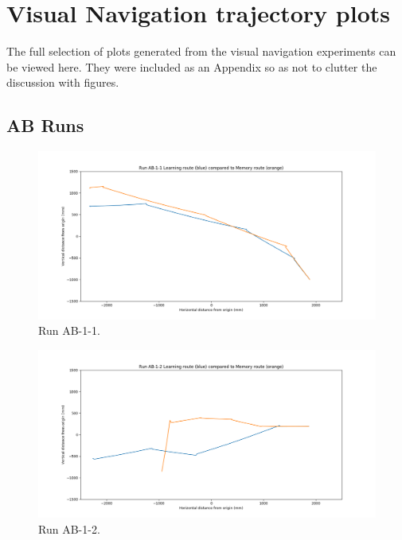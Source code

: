 \documentclass[a4paper,12pt,twoside,openright]{article}
\begin{document}


\newpage

\appendix
\section{Visual Navigation trajectory plots} \label{app:plots}

The full selection of plots generated from the visual navigation experiments can be viewed here. They were included
as an Appendix so as not to clutter the discussion with figures.

\subsection{AB Runs}

\begin{figure}[h!]
 \centering
  \includegraphics[width=\textwidth]{AB-1-1}
  \caption{
    \label{fig:ab-1-1} Run AB-1-1.
  }
\end{figure}

\begin{figure}[h!]
 \centering
  \includegraphics[width=\textwidth]{AB-1-2}
  \caption{
    \label{fig:ab-1-2} Run AB-1-2.
  }
\end{figure}
\end{document}
